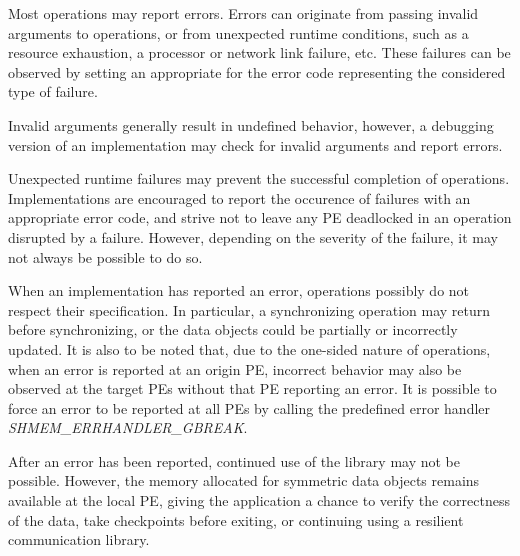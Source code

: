 Most \openshmem operations may report errors. Errors can originate from 
passing invalid arguments to \openshmem operations, or from 
unexpected runtime conditions, such as a resource exhaustion, a processor 
or network link failure, etc. These failures can be observed by setting an 
appropriate  for the error code representing the 
considered type of failure. 

Invalid arguments generally result in undefined behavior, however, a 
debugging version of an \openshmem implementation may check for invalid 
arguments and report errors.

Unexpected runtime failures may prevent the successful completion of \openshmem 
operations. Implementations are encouraged to report the occurence of failures 
with an appropriate error code, and strive not to leave any \ac{PE} deadlocked 
in an operation disrupted by a failure. However, depending on the severity of 
the failure, it may not always be possible to do so.

When an \openshmem implementation has reported an error, operations possibly do
not respect their specification. In particular, a synchronizing operation may 
return before synchronizing, or the data objects could be partially 
or incorrectly updated. It is also to be noted that, due to the one-sided
nature of \openshmem operations, when an error is reported at 
an origin \ac{PE}, incorrect behavior may also be observed at
the target \acp{PE} without that \ac{PE} reporting an error. It is possible 
to force an error to be reported at all \acp{PE} by calling the predefined
error handler \textit{SHMEM\_ERRHANDLER\_GBREAK}.

After an error has been reported, continued use of the \openshmem 
library may not be possible. However, the memory allocated for 
symmetric data objects remains available at the local \ac{PE}, giving the 
application a chance to verify the correctness of the data, take checkpoints 
before exiting, or continuing using a resilient communication library.
